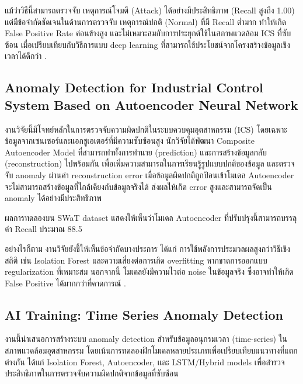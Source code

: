 แม้ว่าวิธีนี้สามารถตรวจจับ เหตุการณ์โจมตี (Attack) ได้อย่างมีประสิทธิภาพ (Recall สูงถึง 1.00) แต่มีข้อจำกัดชัดเจนในด้านการตรวจจับ เหตุการณ์ปกติ (Normal) ที่มี Recall ต่ำมาก ทำให้เกิด False Positive Rate ค่อนข้างสูง และไม่เหมาะสมกับการประยุกต์ใช้ในสภาพแวดล้อม ICS ที่ซับซ้อน เมื่อเปรียบเทียบกับวิธีการแบบ deep learning ที่สามารถใช้ประโยชน์จากโครงสร้างข้อมูลเชิงเวลาได้ดีกว่า \cite{ref4}.

\subsection{Anomaly Detection for Industrial Control System Based on Autoencoder Neural Network}
\hspace{2em} งานวิจัยนี้มีโจทย์หลักในการตรวจจับความผิดปกติในระบบควบคุมอุตสาหกรรม (ICS) โดยเฉพาะข้อมูลจากเซนเซอร์และแอกชูเอเตอร์ที่มีความซับซ้อนสูง นักวิจัยได้พัฒนา Composite Autoencoder Model ที่สามารถทำทั้งการทำนาย (prediction) และการสร้างข้อมูลกลับ (reconstruction) ไปพร้อมกัน เพื่อเพิ่มความสามารถในการเรียนรู้รูปแบบปกติของข้อมูล และตรวจจับ anomaly ผ่านค่า reconstruction error เมื่อข้อมูลผิดปกติถูกป้อนเข้าโมเดล Autoencoder จะไม่สามารถสร้างข้อมูลที่ใกล้เคียงกับข้อมูลจริงได้ ส่งผลให้เกิด error สูงและสามารถจัดเป็น anomaly ได้อย่างมีประสิทธิภาพ

ผลการทดลองบน SWaT dataset แสดงให้เห็นว่าโมเดล Autoencoder ที่ปรับปรุงนี้สามารถบรรลุค่า Recall ประมาณ 88.5%

อย่างไรก็ตาม งานวิจัยยังชี้ให้เห็นข้อจำกัดบางประการ ได้แก่ การใช้พลังการประมวลผลสูงกว่าวิธีเชิงสถิติ เช่น Isolation Forest และความเสี่ยงต่อการเกิด overfitting หากขาดการออกแบบ regularization ที่เหมาะสม นอกจากนี้ โมเดลยังมีความไวต่อ noise ในข้อมูลจริง ซึ่งอาจทำให้เกิด False Positive ได้มากกว่าที่คาดการณ์ \cite{ref7}.


\subsection{AI Training: Time Series Anomaly Detection}
\hspace{2em} งานนี้นำเสนอการสร้างระบบ anomaly detection สำหรับข้อมูลอนุกรมเวลา (time-series) ในสภาพแวดล้อมอุตสาหกรรม โดยเน้นการทดลองฝึกโมเดลหลายประเภทเพื่อเปรียบเทียบแนวทางที่แตกต่างกัน ได้แก่ Isolation Forest, Autoencoder, และ LSTM/Hybrid models เพื่อสำรวจประสิทธิภาพในการตรวจจับความผิดปกติจากข้อมูลที่ซับซ้อน

